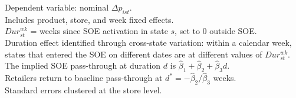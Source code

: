 \begin{table}[htbp]
   \par \raggedright 
   Dependent variable: nominal $\Delta p_{ist}$.\\
   Includes product, store, and week fixed effects.\\
   $Dur^{wk}_{st}$ = weeks since SOE activation in state $s$, set to 0 outside SOE.\\
   Duration effect identified through cross-state variation: within a calendar week,\\
   states that entered the SOE on different dates are at different values of $Dur^{wk}_{st}$.\\
   The implied SOE pass-through at duration $d$ is $\hat{\beta}_1 + \hat{\beta}_2 + \hat{\beta}_3 d$.\\
   Retailers return to baseline pass-through at $d^* = -\hat{\beta}_2 / \hat{\beta}_3$ weeks.\\
   Standard errors clustered at the store level.
\end{table}



